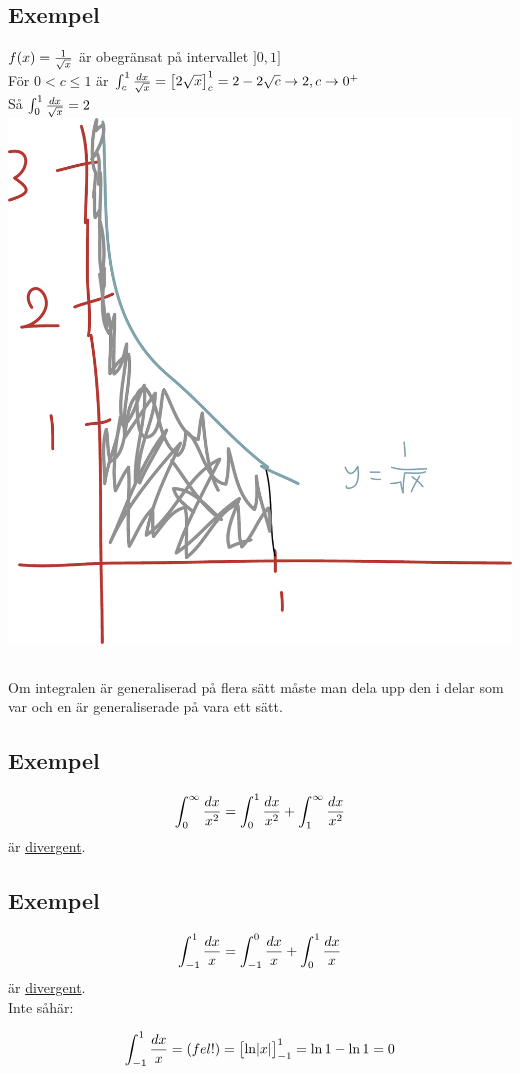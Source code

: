 \documentclass{article}
\begin{document}
\subsection{Exempel}
$f(x)=\frac{1}{\sqrt{x}}$ är obegränsat på intervallet $]0,1]$\\
För $0<c\le 1$ är $\int^1_c{dx \over \sqrt{x}} = \left[\begin{matrix}2\sqrt{x}\end{matrix}\right]^1_c = 2-2\sqrt{c} \to 2, c\to 0^+$\\
Så $\int_0^1{\frac{dx}{\sqrt{x}}} = 2$\\
\includegraphics[scale=0.25]{img/img13.pdf}

\subsection{}
Om integralen är generaliserad på flera sätt måste man dela upp den i delar som var och en är generaliserade på vara ett sätt.

\subsection{Exempel}
$$ \int^\infty_0{dx \over x^2} = \int^1_0{dx \over x^2} + \int^\infty_1{dx \over x^2} $$
är \uline{divergent}.

\subsection{Exempel}
$$ \int^1_{-1}{dx \over x} = \int^0_{-1}{dx \over x} + \int^1_0{dx \over x} $$
är \uline{divergent}.\\
Inte såhär:

$$ \int^1_{-1}{dx \over x} = (fel!) = \left[\begin{matrix}\ln\lvert x\rvert\end{matrix}\right]^1_{-1} = \ln 1 - \ln 1 = 0 $$
\end{document}
